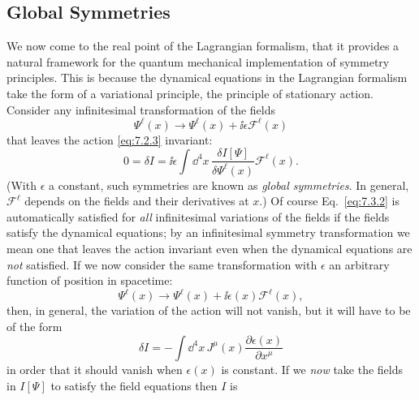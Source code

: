 
\subsection{Global Symmetries}

We now come to the real point of the Lagrangian formalism, that it provides a
natural framework for the quantum mechanical implementation of symmetry
principles. This is because the dynamical equations in the Lagrangian formalism
take the form of a variational principle, the principle of stationary action.
Consider any infinitesimal transformation of the fields
\begin{equation}
\Psi^\ell(x)\longrightarrow\Psi^\ell(x)+\ii\epsilon\mathcal{F}^\ell(x)
\tag{7.3.1}\label{eq:7.3.1}
\end{equation}
that leaves the action \eqref{eq:7.2.3} invariant:
\begin{equation}
0=\delta I=\ii\epsilon\int \dd^4x\,
\frac{\delta I[\Psi]}{\delta\Psi^\ell(x)}\mathcal{F}^\ell(x).
\tag{7.3.2}\label{eq:7.3.2}
\end{equation}
(With $\epsilon$ a constant, such symmetries are known as \emph{global
symmetries}. In general, $\mathcal{F}^\ell$ depends on the fields and their
derivatives at $x$.) Of course Eq.~\eqref{eq:7.3.2} is automatically satisfied for
\emph{all} infinitesimal variations of the fields if the fields satisfy the
dynamical equations; by an infinitesimal symmetry transformation we mean one
that leaves the action invariant even when the dynamical equations are
\emph{not} satisfied. If we now consider the same transformation with
$\epsilon$ an arbitrary function of position in spacetime:
\begin{equation}
\Psi^\ell(x)\longrightarrow\Psi^\ell(x)
+\ii\epsilon(x)\mathcal{F}^\ell(x),
\tag{7.3.3}\label{eq:7.3.3}
\end{equation}
then, in general, the variation of the action will not vanish, but it will
have to be of the form
\begin{equation}
\delta I=-\int \dd^4x\,J^\mu(x)\frac{\partial\epsilon(x)}{\partial x^\mu}
\tag{7.3.4}\label{eq:7.3.4}
\end{equation}
in order that it should vanish when $\epsilon(x)$ is constant. If we \emph{now}
take the fields in $I[\Psi]$ to satisfy the field equations then $I$ is
